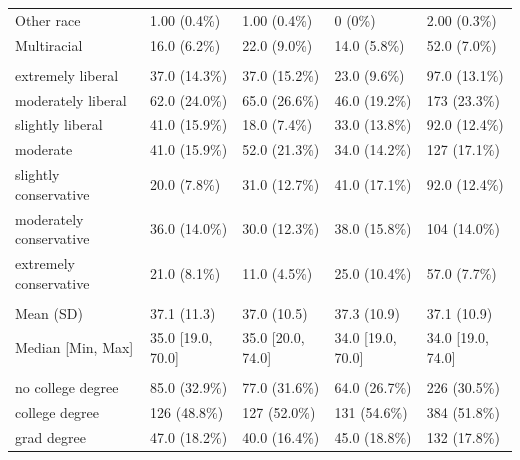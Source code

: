 \documentclass[
]{book}
\begin{document}
\begin{table}
\begin{tabular}[t]{lllll}
\hspace{1em}Other race & 1.00 (0.4\%) & 1.00 (0.4\%) & 0 (0\%) & 2.00 (0.3\%)\\
\hspace{1em}Multiracial & 16.0 (6.2\%) & 22.0 (9.0\%) & 14.0 (5.8\%) & 52.0 (7.0\%)\\
\addlinespace[0.3em]
\multicolumn{5}{l}{\textbf{Political orientation}}\\
\hspace{1em}extremely liberal & 37.0 (14.3\%) & 37.0 (15.2\%) & 23.0 (9.6\%) & 97.0 (13.1\%)\\
\hspace{1em}moderately liberal & 62.0 (24.0\%) & 65.0 (26.6\%) & 46.0 (19.2\%) & 173 (23.3\%)\\
\hspace{1em}slightly liberal & 41.0 (15.9\%) & 18.0 (7.4\%) & 33.0 (13.8\%) & 92.0 (12.4\%)\\
\hspace{1em}moderate & 41.0 (15.9\%) & 52.0 (21.3\%) & 34.0 (14.2\%) & 127 (17.1\%)\\
\hspace{1em}slightly conservative & 20.0 (7.8\%) & 31.0 (12.7\%) & 41.0 (17.1\%) & 92.0 (12.4\%)\\
\hspace{1em}moderately conservative & 36.0 (14.0\%) & 30.0 (12.3\%) & 38.0 (15.8\%) & 104 (14.0\%)\\
\hspace{1em}extremely conservative & 21.0 (8.1\%) & 11.0 (4.5\%) & 25.0 (10.4\%) & 57.0 (7.7\%)\\
\addlinespace[0.3em]
\multicolumn{5}{l}{\textbf{Age}}\\
\hspace{1em}Mean (SD) & 37.1 (11.3) & 37.0 (10.5) & 37.3 (10.9) & 37.1 (10.9)\\
\hspace{1em}Median [Min, Max] & 35.0 [19.0, 70.0] & 35.0 [20.0, 74.0] & 34.0 [19.0, 70.0] & 34.0 [19.0, 74.0]\\
\addlinespace[0.3em]
\multicolumn{5}{l}{\textbf{Education}}\\
\hspace{1em}no college degree & 85.0 (32.9\%) & 77.0 (31.6\%) & 64.0 (26.7\%) & 226 (30.5\%)\\
\hspace{1em}college degree & 126 (48.8\%) & 127 (52.0\%) & 131 (54.6\%) & 384 (51.8\%)\\
\hspace{1em}grad degree & 47.0 (18.2\%) & 40.0 (16.4\%) & 45.0 (18.8\%) & 132 (17.8\%)\\

\end{tabular}
\end{table}
\end{document}
